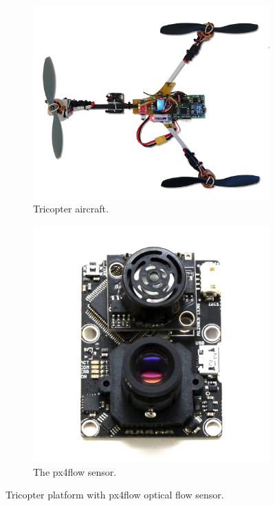 \begin{figure}[tbp]
\centering

\begin{subfigure}[b]{0.55\textwidth}
	\includegraphics[width=\textwidth]{fig/tri1.jpg}
	\caption{Tricopter aircraft.}
	\label{fig:tricopter}
\end{subfigure}%
\begin{subfigure}[b]{0.45\textwidth}
	\includegraphics[width=\textwidth]{fig/px4flow.jpg}
	\caption{The px4flow sensor.}
	\label{fig:px4flow}
\end{subfigure}

\caption{Tricopter platform with px4flow optical flow sensor.}
\label{fig:tricopter_px4flow}
\end{figure}

